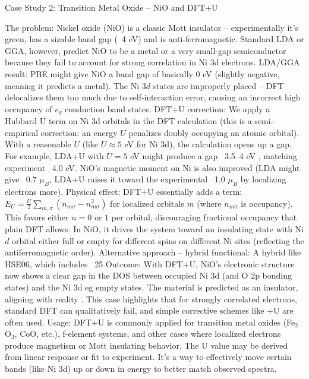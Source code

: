 \begin{frame}{Case Study 2: Transition Metal Oxide – NiO and DFT+U}

The problem: Nickel oxide (NiO) is a classic Mott insulator – experimentally it’s green, has a sizable band gap (~4 eV) and is anti-ferromagnetic. Standard LDA or GGA, however, predict NiO to be a metal or a very small-gap semiconductor because they fail to account for strong correlation in Ni 3d electrons.
LDA/GGA result: PBE might give NiO a band gap of basically 0 eV (slightly negative, meaning it predicts a metal). The Ni $3d$ states are improperly placed – DFT delocalizes them too much due to self-interaction error, causing an incorrect high occupancy of $e_g$ conduction band states.
DFT+U correction: We apply a Hubbard U term on Ni 3d orbitals in the DFT calculation (this is a semi-empirical correction: an energy $U$ penalizes doubly occupying an atomic orbital). With a reasonable $U$ (like $U \approx 5$ eV for Ni 3d), the calculation opens up a gap. For example, LDA+U with $U=5$ eV might produce a gap ~3.5–4 eV , matching experiment ~4.0 eV. NiO’s magnetic moment on Ni is also improved (LDA might give ~0.7 $\mu_B$, LDA+U raises it toward the experimental ~1.0 $\mu_B$ by localizing electrons more).
Physical effect: DFT+U essentially adds a term: $E_U = \frac{U}{2}\sum_{m,\sigma}(n_{m\sigma}-n_{m\sigma}^2)$ for localized orbitals $m$ (where $n_{m\sigma}$ is occupancy). This favors either $n=0$ or $1$ per orbital, discouraging fractional occupancy that plain DFT allows. In NiO, it drives the system toward an insulating state with Ni $d$ orbital either full or empty for different spins on different Ni sites (reflecting the antiferromagnetic order).
Alternative approach – hybrid functional: A hybrid like HSE06, which includes ~25%
Outcome: With DFT+U, NiO’s electronic structure now shows a clear gap in the DOS between occupied Ni 3d (and O 2p bonding states) and the Ni 3d eg empty states. The material is predicted as an insulator, aligning with reality . This case highlights that for strongly correlated electrons, standard DFT can qualitatively fail, and simple corrective schemes like +U are often used.
Usage: DFT+U is commonly applied for transition metal oxides (Fe$_2$O$_3$, CoO, etc.), f-element systems, and other cases where localized electrons produce magnetism or Mott insulating behavior. The U value may be derived from linear response or fit to experiment. It’s a way to effectively move certain bands (like Ni 3d) up or down in energy to better match observed spectra. \end{frame}


